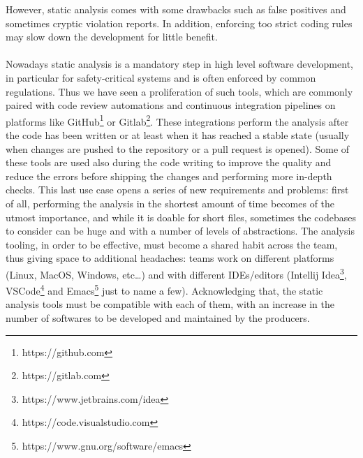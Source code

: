 However, static analysis comes with some drawbacks such as false positives and sometimes cryptic violation reports. In addition, enforcing too strict coding rules may slow down the development for little benefit.
\\\\
Nowadays static analysis is a mandatory step in high level software development, in particular for safety-critical systems and is often enforced by common regulations. Thus we have seen a proliferation of such tools, which are commonly paired with code review automations and continuous integration pipelines on platforms like GitHub\footnote{https://github.com} or Gitlab\footnote{https://gitlab.com}. These integrations perform the analysis after the code has been written or at least when it has reached a stable state (usually when changes are pushed to the repository or a pull request is opened). 
Some of these tools are used also during the code writing to improve the quality and reduce the errors before shipping the changes and performing more in-depth checks. 
This last use case opens a series of new requirements and problems: first of all, performing the analysis in the shortest amount of time becomes of the utmost importance, and while it is doable for short files, sometimes the codebases to consider can be huge and with a number of levels of abstractions. The analysis tooling, in order to be effective, must become a shared habit across the team, thus giving space to additional headaches: teams work on different platforms (Linux, MacOS, Windows, etc…) and with different IDEs/editors (Intellij Idea\footnote{https://www.jetbrains.com/idea}, VSCode\footnote{https://code.visualstudio.com} and Emacs\footnote{https://www.gnu.org/software/emacs} just to name a few). Acknowledging that, the static analysis tools must be compatible with each of them, with an increase in the number of softwares to be developed and maintained by the producers. 
